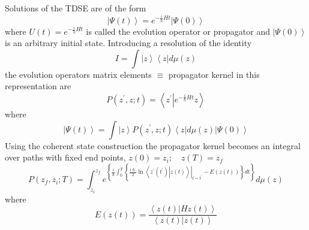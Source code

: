 \documentclass[aps,preprint]{revtex4}%
\begin{document}
Solutions of the TDSE are of the form
\begin{equation}
\left\vert \Psi\left(  t\right)  \right\rangle =e^{-\frac{i}{h}Ht}\left\vert
\Psi\left(  0\right)  \right\rangle
\end{equation}
where $U\left(  t\right)  =e^{-\frac{i}{h}Ht}$ is called the evolution
operator or propagator and $\left\vert \Psi\left(  0\right)  \right\rangle $
is an arbitrary initial state. Introducing a resolution of the identity
\begin{equation}
I=\int\left\vert z\right\rangle \left\langle z\right\vert d\mu\left(
z\right)
\end{equation}
the evolution operators matrix elements $\equiv$ propagator kernel in this
representation are
\begin{equation}
P\left(  z^{\prime},z;t\right)  =\left\langle z^{\prime}\left\vert
e^{-\frac{i}{h}Ht}\right.  z\right\rangle
\end{equation}
where%
\begin{equation}
\left\vert \Psi\left(  t\right)  \right\rangle =\int\left\vert z\right\rangle
P\left(  z^{\prime},z;t\right)  \left\langle z\right\vert d\mu\left(
z\right)  \left\vert \Psi\left(  0\right)  \right\rangle
\end{equation}
Using the coherent state construction the propagator kernel becomes an
integral over paths with fixed end points, $z\left(  0\right)  =z_{i};\quad
z\left(  T\right)  =z_{f}$
\begin{equation}
P\left(  z_{f},z_{i};T\right)  =\int_{z_{i}}^{z_{f}}e^{\left\{  \frac
{i}{\hslash}\int_{0}^{T}\left\{  \frac{i\hslash}{2}\left.  \ln\left\langle
\left.  z^{\prime}\left(  t^{\prime}\right)  \right\vert z\left(  t\right)
\right\rangle \right\vert _{t=t^{\prime}}-E\left(  z\left(  t\right)  \right)
\right\}  dt\right\}  }d\mu\left(  z\right)
\end{equation}
where
\begin{equation}
E\left(  z\left(  t\right)  \right)  =\frac{\left\langle \left.  z\left(
t\right)  \right\vert Hz\left(  t\right)  \right\rangle }{\left\langle \left.
z\left(  t\right)  \right\vert z\left(  t\right)  \right\rangle }%
\end{equation}
\end{document}
